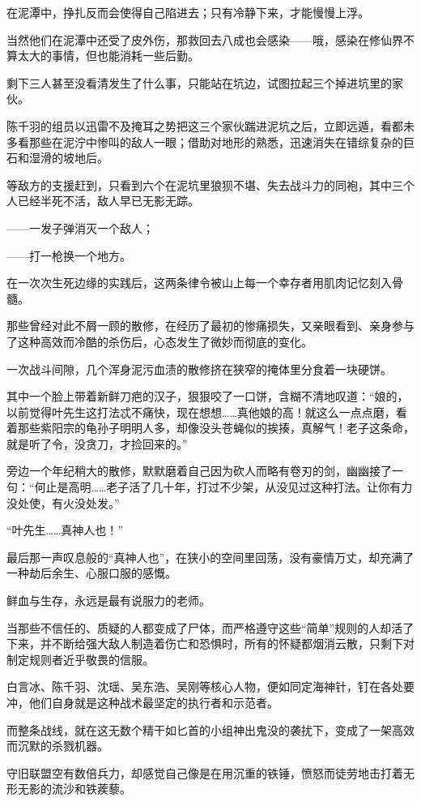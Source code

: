 在泥潭中，挣扎反而会使得自己陷进去；只有冷静下来，才能慢慢上浮。

当然他们在泥潭中还受了皮外伤，那救回去八成也会感染——哦，感染在修仙界不算太大的事情，但也能消耗一些后勤。

剩下三人甚至没看清发生了什么事，只能站在坑边，试图拉起三个掉进坑里的家伙。

陈千羽的组员以迅雷不及掩耳之势把这三个家伙踹进泥坑之后，立即远遁，看都未多看那些在泥泞中惨叫的敌人一眼；借助对地形的熟悉，迅速消失在错综复杂的巨石和湿滑的坡地后。

等敌方的支援赶到，只看到六个在泥坑里狼狈不堪、失去战斗力的同袍，其中三个人已经半死不活，敌人早已无影无踪。

——一发子弹消灭一个敌人；

——打一枪换一个地方。

在一次次生死边缘的实践后，这两条律令被山上每一个幸存者用肌肉记忆刻入骨髓。

那些曾经对此不屑一顾的散修，在经历了最初的惨痛损失，又亲眼看到、亲身参与了这种高效而冷酷的杀伤后，心态发生了微妙而彻底的变化。

一次战斗间隙，几个浑身泥污血渍的散修挤在狭窄的掩体里分食着一块硬饼。

其中一个脸上带着新鲜刀疤的汉子，狠狠咬了一口饼，含糊不清地叹道：“娘的，以前觉得叶先生这打法忒不痛快，现在想想……真他娘的高！就这么一点点磨，看着那些紫阳宗的龟孙子明明人多，却像没头苍蝇似的挨揍，真解气！老子这条命，就是听了令，没贪刀，才捡回来的。”

旁边一个年纪稍大的散修，默默磨着自己因为砍人而略有卷刃的剑，幽幽接了一句：“何止是高明……老子活了几十年，打过不少架，从没见过这种打法。让你有力没处使，有火没处发。”

“叶先生……真神人也！”

最后那一声叹息般的“真神人也”，在狭小的空间里回荡，没有豪情万丈，却充满了一种劫后余生、心服口服的感慨。

鲜血与生存，永远是最有说服力的老师。

当那些不信任的、质疑的人都变成了尸体，而严格遵守这些“简单”规则的人却活了下来，并不断给强大敌人制造着伤亡和恐惧时，所有的怀疑都烟消云散，只剩下对制定规则者近乎敬畏的信服。

白言冰、陈千羽、沈瑶、吴东浩、吴刚等核心人物，便如同定海神针，钉在各处要冲，他们自身就是这种战术最坚定的执行者和示范者。

而整条战线，就在这无数个精干如匕首的小组神出鬼没的袭扰下，变成了一架高效而沉默的杀戮机器。

守旧联盟空有数倍兵力，却感觉自己像是在用沉重的铁锤，愤怒而徒劳地击打着无形无影的流沙和铁蒺藜。

